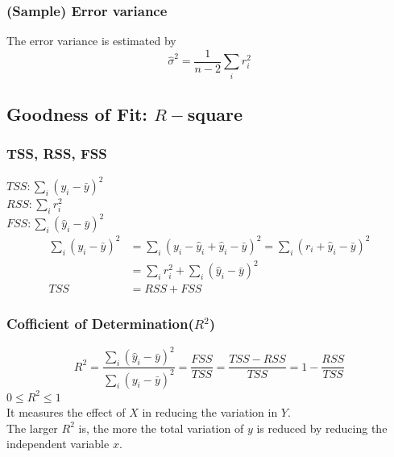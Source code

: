 \documentclass[11pt,a4paper]{article}
\begin{document}
\subsubsection{(Sample) Error variance}
The error variance is estimated by$$\hat{\sigma}^2=\frac{1}{n-2}\sum_i r_i^2$$

\subsection{Goodness of Fit: $R-$square}
\subsubsection{TSS, RSS, FSS}
$TSS: \sum_i(y_i-\bar{y})^2$\\
$RSS: \sum_ir_i^2$\\
$FSS: \sum_i(\hat{y}_i-\bar{y})^2$
$$\begin{aligned}
    \sum_{i}\left(y_{i}-\bar{y}\right)^{2} &=\sum_{i}\left(y_{i}-\hat{y}_{i}+\hat{y}_{i}-\bar{y}\right)^{2}=\sum_{i}\left(r_{i}+\hat{y}_{i}-\bar{y}\right)^{2} \\
    &=\sum_{i} r_{i}^{2}+\sum_{i}\left(\hat{y}_{i}-\bar{y}\right)^{2} \\
    T S S &=R S S+F S S
    \end{aligned}$$
\subsubsection{Cofficient of Determination($R^2$)}
$$R^{2}=\frac{\sum_{i}\left(\hat{y}_{i}-\bar{y}\right)^{2}}{\sum_{i}\left(y_{i}-\bar{y}\right)^{2}}=\frac{F S S}{T S S}=\frac{T S S-R S S}{T S S}=1-\frac{R S S}{T S S}$$
$0\leq R^2\leq 1$\\
It measures the effect of $X$ in reducing the variation in $Y$.\\
The larger $R^2$ is, the more the total variation of $y$ is reduced by reducing the independent variable $x$.\\
\end{document}
